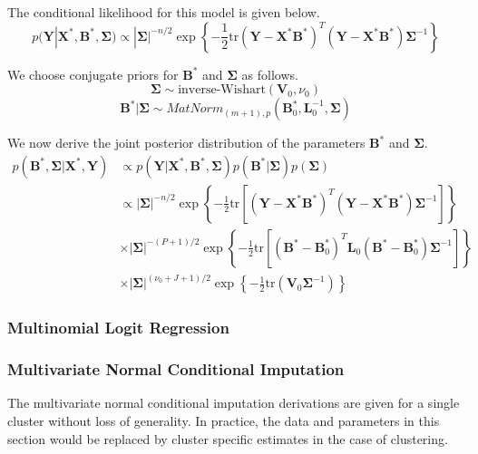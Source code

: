 \documentclass{article}
\newcommand{\tr}{\mbox{tr}}
\begin{document}
The conditional likelihood for this model is given below. 
$$p(\mathbf{Y}|\mathbf{X}^*,\mathbf{B}^*,\boldsymbol\Sigma) \propto |\boldsymbol\Sigma|^{-n/2}\exp \left \{ -\frac{1}{2} \tr(\mathbf{Y} - \mathbf{X}^* \mathbf{B}^*)^T(\mathbf{Y} - \mathbf{X}^* \mathbf{B}^*)\boldsymbol\Sigma^{-1} \right \}$$

We choose conjugate priors for $\mathbf{B}^*$ and $\boldsymbol\Sigma$ as follows. 
$$\boldsymbol\Sigma \sim \text{inverse-Wishart}(\mathbf{V}_0,\nu_0)$$
$$\mathbf{B}^*|\boldsymbol\Sigma \sim MatNorm_{(m+1), p}(\mathbf{B}_0^*,\mathbf{L}_0^{-1},\boldsymbol\Sigma)$$

We now derive the joint posterior distribution of the parameters $\mathbf{B}^*$ and $\boldsymbol\Sigma$.
\begin{align*} 
p(\mathbf{B}^*,\boldsymbol\Sigma|\mathbf{X}^*,\mathbf{Y}) & \propto  p(\mathbf{Y}|\mathbf{X}^*,\mathbf{B}^*,\boldsymbol\Sigma)p(\mathbf{B}^*|\boldsymbol\Sigma)p(\boldsymbol\Sigma)\\
&  \propto |\boldsymbol\Sigma|^{-n/2}\exp \left \{ -\frac{1}{2} \tr \left [(\mathbf{Y} - \mathbf{X^*}\mathbf{B}^*)^T(\mathbf{Y} - \mathbf{X^*}\mathbf{B}^*)\boldsymbol\Sigma^{-1} \right ]\right \} \\
& \times |\boldsymbol\Sigma|^{-(P+1)/2} \exp \left \{ -\frac{1}{2} \tr \left [(\mathbf{B}^* - \mathbf{B}^*_0)^T \mathbf{L}_0(\mathbf{B}^* - \mathbf{B}^*_0)\boldsymbol\Sigma^{-1} \right ]\right \} \\
& \times |\boldsymbol\Sigma|^{(\nu_0 + J + 1)/2} \exp \left \{ -\frac{1}{2} \tr (\mathbf{V}_0 \boldsymbol\Sigma^{-1}) \right \}
\end{align*}



\subsubsection{Multinomial Logit Regression}

\subsubsection{Multivariate Normal Conditional Imputation}

The multivariate normal conditional imputation derivations are given for a single cluster without loss of generality. In practice, the data and parameters in this section would be replaced by cluster specific estimates in the case of clustering. 
\end{document}
